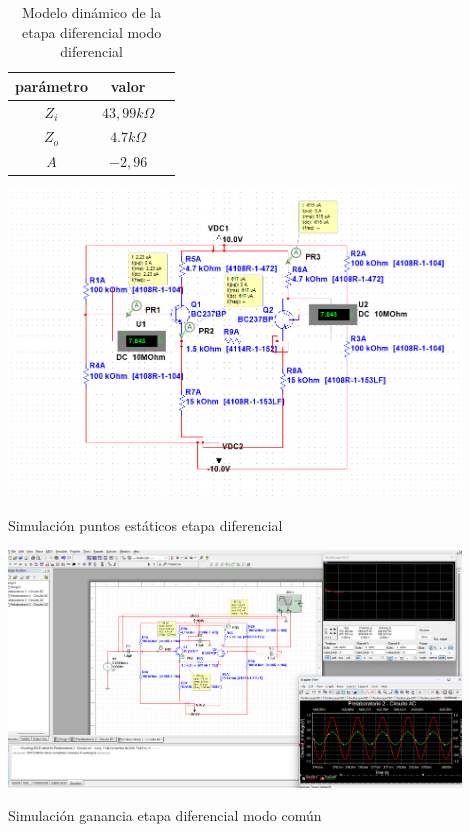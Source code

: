 \begin{table}[ht]
    \centering
    \begin{tabular}{|c|c|c|}
        \hline
        parámetro & valor  \\
        \hline
        $Z_i$ & $43,99k\Omega$ \\
        \hline
        $Z_o$ & $4.7k\Omega$ \\
        \hline
        $A$ & $-2,96$ \\
        \hline
    \end{tabular}
    \caption{Modelo dinámico de la etapa diferencial modo diferencial}
    \label{tab:met-etapa-diferencial-modelo-dinamico-modo-diferencial}
\end{table}

\begin{ilustracion}[ht]
    \centering
    \includegraphics[width=0.9\textwidth]{src/images/p2/punto-estatico-p2.png}
    \caption{Simulación puntos estáticos etapa diferencial}
    \label{ilus:sim-etapa-diferencial-puntos-estaticos}
\end{ilustracion}

\begin{ilustracion}[ht]
    \centering
    \includegraphics[width=0.9\textwidth]{src/images/p2/ganancia-etapa-diff-modo-comun.png}
    \caption{Simulación ganancia etapa diferencial modo común}
    \label{ilus:sim-etapa-diferencial-ganancia-modo-comun}
\end{ilustracion}

